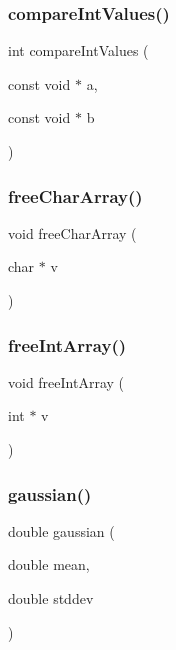 \label{lib__util_8h_a0332554d07bfa6f16c72bf25a812f4b1} 
\subsubsection{compare\+Int\+Values()}
{\footnotesize\ttfamily int compare\+Int\+Values (\begin{DoxyParamCaption}\item[{const void $\ast$}]{a,  }\item[{const void $\ast$}]{b }\end{DoxyParamCaption})}

\label{lib__util_8h_a6696c76d3d7686350903547f51165d67} 
\subsubsection{free\+Char\+Array()}
{\footnotesize\ttfamily void free\+Char\+Array (\begin{DoxyParamCaption}\item[{char $\ast$}]{v }\end{DoxyParamCaption})}

\label{lib__util_8h_a6e2f0bf3d35dd28d0d3e28953f745556} 
\subsubsection{free\+Int\+Array()}
{\footnotesize\ttfamily void free\+Int\+Array (\begin{DoxyParamCaption}\item[{int $\ast$}]{v }\end{DoxyParamCaption})}

\label{lib__util_8h_a8d0940427034cc3fd70a33400ba9ac16} 
\subsubsection{gaussian()}
{\footnotesize\ttfamily double gaussian (\begin{DoxyParamCaption}\item[{double}]{mean,  }\item[{double}]{stddev }\end{DoxyParamCaption})}

